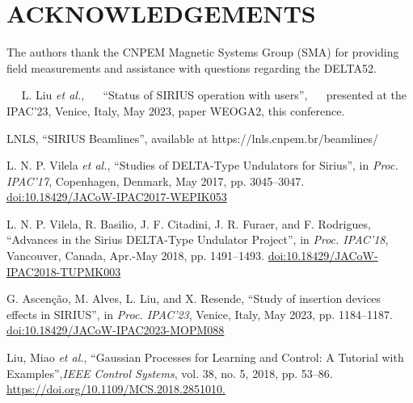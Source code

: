\documentclass[a4paper,
               keeplastbox,   %
               ]{jacow}
\begin{document}
\section{ACKNOWLEDGEMENTS}

The authors thank the CNPEM Magnetic Systems Group (SMA) for providing field measurements and assistance with questions regarding the DELTA52.

	\begin{thebibliography}{14} %

   L. Liu \emph{et al.},
   \textquotedblleft{Status of SIRIUS operation with users}\textquotedblright,
   presented at the IPAC’23, Venice, Italy, May 2023, paper WEOGA2, this conference.   
    


        LNLS,
        \textquotedblleft{SIRIUS Beamlines}\textquotedblright,
        available at https://lnls.cnpem.br/beamlines/

        L. N. P. Vilela \emph{et al.},
        \textquotedblleft{Studies of DELTA-Type Undulators for Sirius}\textquotedblright,
        in \emph{Proc. IPAC’17}, Copenhagen, Denmark, May 2017, pp. 3045--3047.
        \url{doi:10.18429/JACoW-IPAC2017-WEPIK053} 
    
   L. N. P. Vilela, R. Basilio, J. F. Citadini, J. R. Furaer, and F. Rodrigues,
   \textquotedblleft{Advances in the Sirius DELTA-Type Undulator Project}\textquotedblright,
   in \emph{Proc. IPAC’18}, Vancouver, Canada, Apr.-May 2018, pp. 1491--1493.
   \url{doi:10.18429/JACoW-IPAC2018-TUPMK003}  

   G. Ascenção, M. Alves, L. Liu, and X. Resende,
   \textquotedblleft{Study of insertion devices effects in SIRIUS}\textquotedblright,
   in \emph{Proc. IPAC’23}, Venice, Italy, May 2023, pp. 1184--1187.
   \url{doi:10.18429/JACoW-IPAC2023-MOPM088}    

    Liu, Miao \emph{et al.},  
    \textquotedblleft{Gaussian Processes for Learning and Control: A Tutorial with Examples}\textquotedblright,\emph{IEEE Control Systems}, vol. 38, no. 5, 2018, pp. 53–86.
    \url{https://doi.org/10.1109/MCS.2018.2851010. }


\end{thebibliography}
\end{document}
